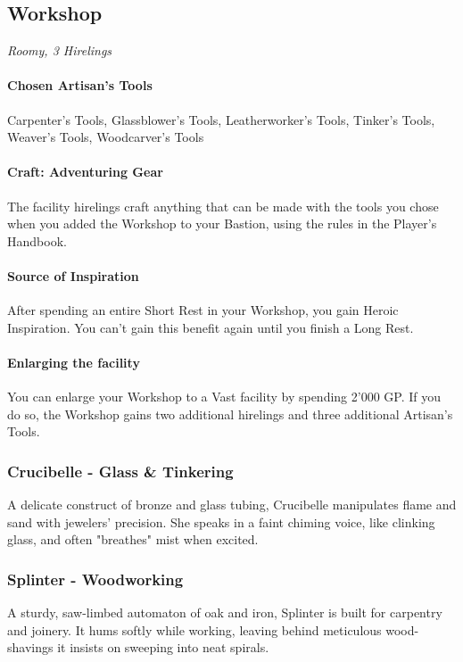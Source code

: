 \subsection*{ Workshop}
{\textit{Roomy, 3 Hirelings}}

{\entryfont \paragraph*{Chosen Artisan's Tools} Carpenter's Tools, Glassblower's Tools, Leatherworker's Tools, Tinker's Tools, Weaver's Tools, Woodcarver's Tools}

{\entryfont \paragraph*{Craft: Adventuring Gear} The facility hirelings craft anything that can be made with the tools you chose when you added the Workshop to your Bastion, using the rules in the Player's Handbook.}

{\entryfont \paragraph*{Source of Inspiration} After spending an entire Short Rest in your Workshop, you gain Heroic Inspiration. You can't gain this benefit again until you finish a Long Rest.}

{\entryfont \paragraph*{Enlarging the facility} You can enlarge your Workshop to a Vast facility by spending 2'000 GP. If you do so, the Workshop gains two additional hirelings and three additional Artisan's Tools.}
\subsubsection*{Crucibelle - Glass \& Tinkering}
{\entryfont A delicate construct of bronze and glass tubing, Crucibelle manipulates flame and sand with jewelers' precision. She speaks in a faint chiming voice, like clinking glass, and often "breathes" mist when excited.}
\subsubsection*{Splinter - Woodworking}
{\entryfont A sturdy, saw-limbed automaton of oak and iron, Splinter is built for carpentry and joinery. It hums softly while working, leaving behind meticulous wood-shavings it insists on sweeping into neat spirals.}
